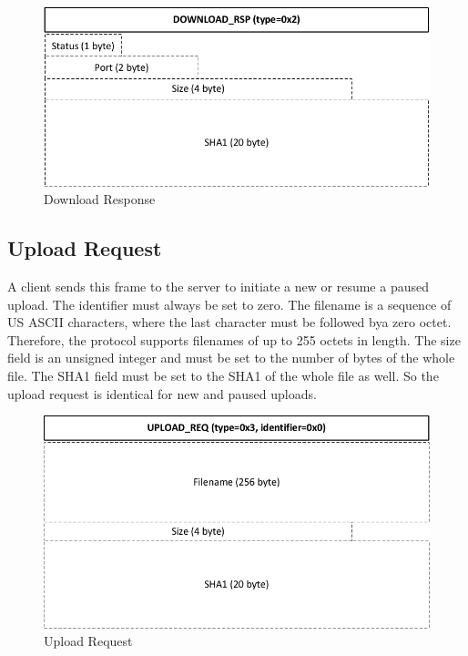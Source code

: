 \documentclass[]{article}
\begin{document}
\begin{figure}[H]
\centering
\includegraphics[width=\textwidth]{frames/download-rsp.pdf}
\caption{Download Response}
\label{DOWNLOAD-RSP}
\end{figure}

\subsection{Upload Request}

A client sends this frame to the server to initiate a new 
or resume a paused upload. The identifier must always be set to zero.  
The filename is a sequence of US ASCII
characters, where the last character must be followed bya zero octet.
Therefore, the protocol supports filenames of up to 255 octets in length.
The size field is an unsigned integer and must be set to the number
of bytes of the whole file. The SHA1 field must be set to the SHA1
of the whole file as well. So the upload request is identical for
new and paused uploads.

\begin{figure}[H]
\centering
\includegraphics[width=\textwidth]{frames/upload-req.pdf}
\caption{Upload Request}
\label{UPLOAD-REQ}
\end{figure}
\end{document}
